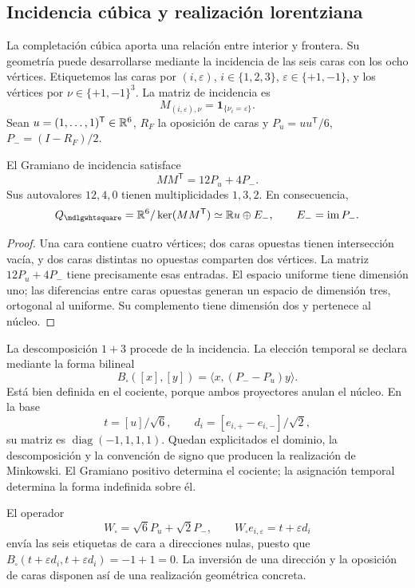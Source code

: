 \subsection{Incidencia cúbica y realización lorentziana}

La completación cúbica aporta una relación entre interior y frontera.
Su geometría puede desarrollarse mediante la incidencia de las seis caras
con los ocho vértices. Etiquetemos las caras por \((i,\varepsilon)\),
\(i\in\{1,2,3\}\), \(\varepsilon\in\{+1,-1\}\), y los vértices por
\(\nu\in\{+1,-1\}^3\). La matriz de incidencia es
\[
 M_{(i,\varepsilon),\nu}=\mathbf1_{\{\nu_i=\varepsilon\}}.
\]
Sean \(u=(1,\ldots,1)^{\mathsf T}\in\mathbb R^6\), \(R_F\) la oposición de
caras y \(P_u=uu^{\mathsf T}/6\), \(P_-=(I-R_F)/2\).

\begin{proposition}
El Gramiano de incidencia satisface
\[
 MM^{\mathsf T}=12P_u+4P_-.
\]
Sus autovalores \(12,4,0\) tienen multiplicidades \(1,3,2\).
En consecuencia,
\[
 Q_\square=\RR^6/\ker(MM^{\mathsf T})
 \simeq\RR u\oplus E_-,\qquad E_-=\operatorname{im}P_-.
\]
\end{proposition}
\begin{proof}
Una cara contiene cuatro vértices; dos caras opuestas tienen intersección
vacía, y dos caras distintas no opuestas comparten dos vértices.
La matriz \(12P_u+4P_-\) tiene precisamente esas entradas.
El espacio uniforme tiene dimensión uno; las diferencias entre caras
opuestas generan un espacio de dimensión tres, ortogonal al uniforme.
Su complemento tiene dimensión dos y pertenece al núcleo.
\end{proof}

La descomposición \(1+3\) procede de la incidencia. La elección temporal
se declara mediante la forma bilineal
\[
 B_\square([x],[y])=\langle x,(P_--P_u)y\rangle.
\]
Está bien definida en el cociente, porque ambos proyectores anulan el
núcleo. En la base
\[
 t=[u]/\sqrt6,\qquad
 d_i=[e_{i,+}-e_{i,-}]/\sqrt2,
\]
su matriz es \(\operatorname{diag}(-1,1,1,1)\). Quedan explicitados
el dominio, la descomposición y la convención de signo que producen
la realización de Minkowski. El Gramiano positivo determina el cociente;
la asignación temporal determina la forma indefinida sobre él.

El operador
\[
 W_\square=\sqrt6P_u+\sqrt2P_-,\qquad
 W_\square e_{i,\varepsilon}=t+\varepsilon d_i
\]
envía las seis etiquetas de cara a direcciones nulas, puesto que
\(B_\square(t+\varepsilon d_i,t+\varepsilon d_i)=-1+1=0\).
La inversión de una dirección y la oposición de caras disponen así
de una realización geométrica concreta.


